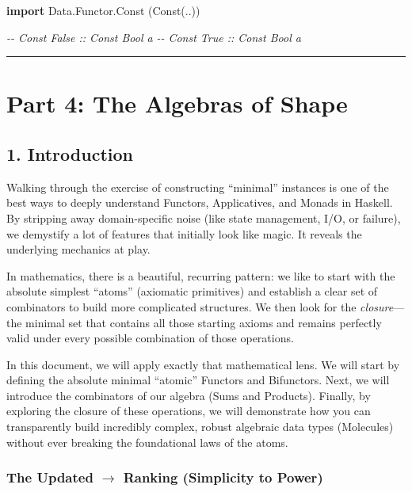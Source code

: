 \documentclass[
]{article}
\newenvironment{Shaded}{}{}
\newcommand{\CommentTok}[1]{\textcolor[rgb]{0.38,0.63,0.69}{\textit{#1}}}
\newcommand{\DataTypeTok}[1]{\textcolor[rgb]{0.56,0.13,0.00}{#1}}
\newcommand{\KeywordTok}[1]{\textcolor[rgb]{0.00,0.44,0.13}{\textbf{#1}}}
\newcommand{\NormalTok}[1]{#1}
\begin{document}
\begin{Shaded}
\begin{Highlighting}[]
\KeywordTok{import} \DataTypeTok{Data.Functor.Const}\NormalTok{ (}\DataTypeTok{Const}\NormalTok{(..))}

\CommentTok{{-}{-} Const False :: Const Bool a}
\CommentTok{{-}{-} Const True  :: Const Bool a}
\end{Highlighting}
\end{Shaded}

\begin{center}\rule{0.5\linewidth}{0.5pt}\end{center}

\section{Part 4: The Algebras of
Shape}\label{part-4-the-algebras-of-shape}

\subsection{1. Introduction}\label{introduction-1}

Walking through the exercise of constructing ``minimal'' instances is
one of the best ways to deeply understand Functors, Applicatives, and
Monads in Haskell. By stripping away domain-specific noise (like state
management, I/O, or failure), we demystify a lot of features that
initially look like magic. It reveals the underlying mechanics at play.

In mathematics, there is a beautiful, recurring pattern: we like to
start with the absolute simplest ``atoms'' (axiomatic primitives) and
establish a clear set of combinators to build more complicated
structures. We then look for the \emph{closure}---the minimal set that
contains all those starting axioms and remains perfectly valid under
every possible combination of those operations.

In this document, we will apply exactly that mathematical lens. We will
start by defining the absolute minimal ``atomic'' Functors and
Bifunctors. Next, we will introduce the combinators of our algebra (Sums
and Products). Finally, by exploring the closure of these operations, we
will demonstrate how you can transparently build incredibly complex,
robust algebraic data types (Molecules) without ever breaking the
foundational laws of the atoms.

\subsubsection{\texorpdfstring{The Updated \(\to\) Ranking (Simplicity
to
Power)}{The Updated \textbackslash to Ranking (Simplicity to Power)}}\label{the-updated-to-ranking-simplicity-to-power}
\end{document}
